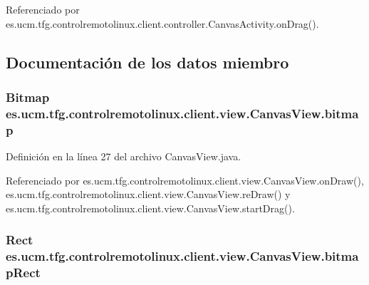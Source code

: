 Referenciado por es.\-ucm.\-tfg.\-controlremotolinux.\-client.\-controller.\-Canvas\-Activity.\-on\-Drag().



\subsection{Documentación de los datos miembro}
\hypertarget{classes_1_1ucm_1_1tfg_1_1controlremotolinux_1_1client_1_1view_1_1CanvasView_a585b28da0c3fe8c11ab199516570666a}{
\subsubsection[{bitmap}]{\setlength{\rightskip}{0pt plus 5cm}Bitmap es.\-ucm.\-tfg.\-controlremotolinux.\-client.\-view.\-Canvas\-View.\-bitmap\hspace{0.3cm}{\ttfamily [private]}}}\label{classes_1_1ucm_1_1tfg_1_1controlremotolinux_1_1client_1_1view_1_1CanvasView_a585b28da0c3fe8c11ab199516570666a}


Definición en la línea 27 del archivo Canvas\-View.\-java.



Referenciado por es.\-ucm.\-tfg.\-controlremotolinux.\-client.\-view.\-Canvas\-View.\-on\-Draw(), es.\-ucm.\-tfg.\-controlremotolinux.\-client.\-view.\-Canvas\-View.\-re\-Draw() y es.\-ucm.\-tfg.\-controlremotolinux.\-client.\-view.\-Canvas\-View.\-start\-Drag().

\hypertarget{classes_1_1ucm_1_1tfg_1_1controlremotolinux_1_1client_1_1view_1_1CanvasView_a9c9c999fbb86a64a82aa8989c9d99a12}{
\subsubsection[{bitmap\-Rect}]{\setlength{\rightskip}{0pt plus 5cm}Rect es.\-ucm.\-tfg.\-controlremotolinux.\-client.\-view.\-Canvas\-View.\-bitmap\-Rect\hspace{0.3cm}{\ttfamily [private]}}}\label{classes_1_1ucm_1_1tfg_1_1controlremotolinux_1_1client_1_1view_1_1CanvasView_a9c9c999fbb86a64a82aa8989c9d99a12}


